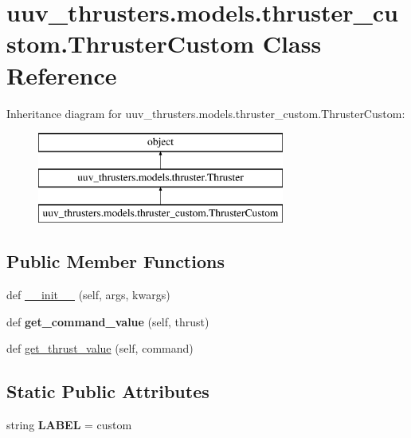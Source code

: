 \hypertarget{classuuv__thrusters_1_1models_1_1thruster__custom_1_1ThrusterCustom}{}\section{uuv\+\_\+thrusters.\+models.\+thruster\+\_\+custom.\+Thruster\+Custom Class Reference}
\label{classuuv__thrusters_1_1models_1_1thruster__custom_1_1ThrusterCustom}
Inheritance diagram for uuv\+\_\+thrusters.\+models.\+thruster\+\_\+custom.\+Thruster\+Custom\+:\begin{figure}[H]
\begin{center}
\leavevmode
\includegraphics[height=3.000000cm]{classuuv__thrusters_1_1models_1_1thruster__custom_1_1ThrusterCustom}
\end{center}
\end{figure}
\subsection*{Public Member Functions}
\begin{DoxyCompactItemize}
\item 
def \hyperlink{classuuv__thrusters_1_1models_1_1thruster__custom_1_1ThrusterCustom_aa4ee50899f9ded03b016ec8536e5923e}{\+\_\+\+\_\+init\+\_\+\+\_\+} (self, args, kwargs)
\item 
\mbox{\label{classuuv__thrusters_1_1models_1_1thruster__custom_1_1ThrusterCustom_a85c0c229aa03b521ecc0431114e721f7}} 
def {\bfseries get\+\_\+command\+\_\+value} (self, thrust)
\item 
def \hyperlink{classuuv__thrusters_1_1models_1_1thruster__custom_1_1ThrusterCustom_ab745b92cb62dc58b4e68d7789aeb57d9}{get\+\_\+thrust\+\_\+value} (self, command)
\end{DoxyCompactItemize}
\subsection*{Static Public Attributes}
\begin{DoxyCompactItemize}
\item 
\mbox{\label{classuuv__thrusters_1_1models_1_1thruster__custom_1_1ThrusterCustom_adbeb7e20a1f91e54ca6ed180f2ddbf0a}} 
string {\bfseries L\+A\+B\+EL} = \textquotesingle{}custom\textquotesingle{}
\end{DoxyCompactItemize}
